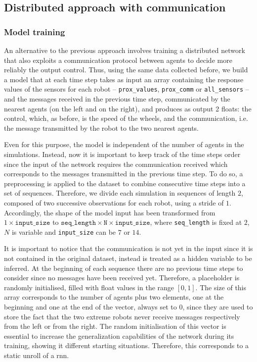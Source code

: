 \subsection{Distributed approach with communication}
\label{subsec:ex1comm}

\subsubsection{Model training}
\label{subsubsec:learnedcomm}
An alternative to the previous approach involves training a distributed network 
that also exploits a communication protocol between agents to decide more 
reliably the output control. 
Thus, using the same data collected before, we build a model that at each time 
step takes as input an array containing the response values of the sensors for each 
robot – \texttt{prox\_values}, \texttt{prox\_comm} or \texttt{all\_sensors} – and 
the messages received in the previous time step, communicated by the nearest 
agents (on the left and on the right), and produces as output 2 floats: the control, 
which, as before, is the speed of the wheels, and the communication, i.e. the 
message transmitted by the robot to the two nearest agents.

Even for this purpose, the model is independent of the number of agents in 
the simulations. Instead, now it is important to keep track of the time steps order 
since the input of the network requires the communication received which 
corresponds to the messages transmitted in the previous time step. To do so, a 
preprocessing is applied to the dataset to combine consecutive 
time steps into a set of sequences. Therefore, we divide each simulation in 
sequences of length $2$, composed of two successive observations for each 
robot, using a stride of $1$.   
Accordingly, the shape of the model input has been transformed from $1 \times 
\mathtt{input\_size}$ to $\mathtt{seq\_length} \times \mathtt{N} \times 
\mathtt{input\_size}$, where \texttt{seq\_length} is fixed at $2$, $N$ is variable 
and \texttt{input\_size} can be $7$ or $14$.

It is important to notice that the communication is not yet in the input since 
it is not contained in the original dataset, instead is treated as a hidden 
variable to be inferred. 
At the beginning of each sequence there are no previous time steps to 
consider since no messages have been received yet. Therefore, a placeholder 
is randomly initialised, filled with float values in the range $[0, 1]$. 
The size of this array corresponds to the number of agents plus two 
elements, one at the beginning and one at the end of the vector, always set 
to $0$, since they are used to store the fact that the two extreme robots 
never receive messages respectively from the left or from the right. 
The random initialisation of this vector is essential to increase the 
generalization capabilities of the network during its training, showing it 
different starting situations.
Therefore, this corresponds to a static unroll of a \gls{rnn}.%

